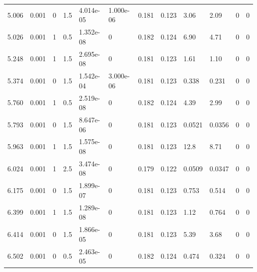 \documentclass[preview]{standalone}
\begin{document}
{{\begin{tabular}{L{1.2cm}C{1.2cm} C{0.3cm}C{0.5cm} C{1.4cm}C{1.4cm} C{1.4cm}C{1.4cm} C{1.6cm}C{1.6cm} C{1.6cm}C{1.6cm}}
  5.006  &  0.001  & 0     & 1.5 &  4.014e-05  & 1.000e-06  &  0.181&   0.123& 3.06 & 2.09   &  0 & 0  \\ 
  5.026  &  0.001  & 1     & 0.5 &  1.352e-08  & 0  &  0.182&   0.124& 6.90 & 4.71   &  0 & 0  \\ 
  5.248  &  0.001  & 1     & 1.5 &  2.695e-08  & 0  &  0.181&   0.123& 1.61 & 1.10   &  0 & 0  \\ 
  5.374  &  0.001  & 0     & 1.5 &  1.542e-04  & 3.000e-06  &  0.181&   0.123& 0.338 & 0.231   &  0 & 0  \\ 
  5.760  &  0.001  & 1     & 0.5 &  2.519e-08  & 0  &  0.182&   0.124& 4.39 & 2.99   &  0 & 0  \\ 
  5.793  &  0.001  & 0     & 1.5 &  8.647e-06  & 0  &  0.181&   0.123& 0.0521 & 0.0356   &  0 & 0  \\ 
  5.963  &  0.001  & 1     & 1.5 &  1.575e-08  & 0  &  0.181&   0.123& 12.8 & 8.71   &  0 & 0  \\ 
  6.024  &  0.001  & 1     & 2.5 &  3.474e-08  & 0  &  0.179&   0.122& 0.0509 & 0.0347   &  0 & 0  \\ 
  6.175  &  0.001  & 0     & 1.5 &  1.899e-07  & 0  &  0.181&   0.123& 0.753 & 0.514   &  0 & 0  \\ 
  6.399  &  0.001  & 1     & 1.5 &  1.289e-08  & 0  &  0.181&   0.123& 1.12 & 0.764   &  0 & 0  \\ 
  6.414  &  0.001  & 0     & 1.5 &  1.866e-05  & 0  &  0.181&   0.123& 5.39 & 3.68   &  0 & 0  \\ 
  6.502  &  0.001  & 0     & 0.5 &  2.463e-05  & 0  &  0.182&   0.124& 0.474 & 0.324   &  0 & 0  \\ 
\hline 
\end{tabular} 

}}
\end{document}

